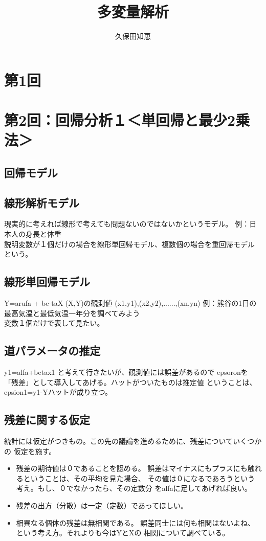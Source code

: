 \documentclass{jsarticle}
\begin{document}
\title{多変量解析}

\author{久保田知恵}
\maketitle

\section{第1回}
\section{第2回：回帰分析１＜単回帰と最少2乗法＞}
\subsection{回帰モデル}


\subsection{線形解析モデル}
現実的に考えれば線形で考えても問題ないのではないかというモデル。
例：日本人の身長と体重\\
説明変数が１個だけの場合を線形単回帰モデル、複数個の場合を重回帰モデル
という。
\subsection{線形単回帰モデル}
Y=arufa + be-taX
(X,Y)の観測値
(x1,y1),(x2,y2),......,(xn,yn)
例：熊谷の1日の最高気温と最低気温一年分を調べてみよう\\
変数１個だけで表して見たい。
\subsection{道パラメータの推定}
y1=alfa+betax1 と考えて行きたいが、観測値には誤差があるので
epsoronを「残差」として導入してあげる。ハットがついたものは推定値
ということは、epsion1=y1-Yハットが成り立つ。
\subsection{残差に関する仮定}
統計には仮定がつきもの。この先の議論を進めるために、残差についていくつかの
仮定を施す。\\
\begin{itemize}
  \item 残差の期待値は０であることを認める。
  誤差はマイナスにもプラスにも触れるということは、その平均を見た場合、
  その値は０になるであろうという考え。もし、０でなかったら、その定数分
  をalfaに足してあげれば良い。
  \item 残差の出方（分散）は一定（定数）であってほしい。
  \item 相異なる個体の残差は無相関である。
  誤差同士には何も相関はないよね、という考え方。それよりも今はYとXの
  相関について調べている。
\end{itemize}
\end{document}

